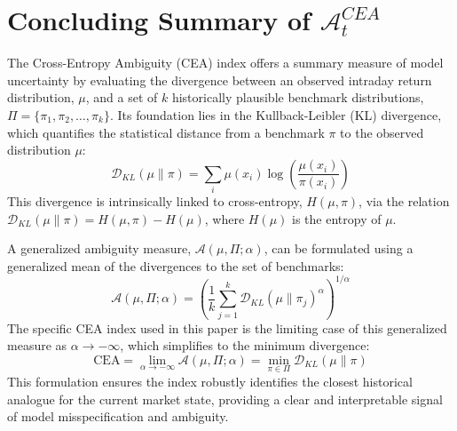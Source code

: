 \documentclass[preprint,12pt,authoryear]{elsarticle}
\begin{document}
\section{Concluding Summary of $\mathcal{A}^{CEA}_t$}
The Cross-Entropy Ambiguity (CEA) index offers a summary measure of model uncertainty by evaluating the divergence between an observed intraday return distribution, $\mu$, and a set of $k$ historically plausible benchmark distributions, $\Pi = \{\pi_1, \pi_2, \dots, \pi_k\}$. Its foundation lies in the Kullback-Leibler (KL) divergence, which quantifies the statistical distance from a benchmark $\pi$ to the observed distribution $\mu$:
\begin{equation}
    \mathcal{D}_{KL}(\mu \| \pi) = \sum_{i} \mu(x_i) \log\left(\frac{\mu(x_i)}{\pi(x_i)}\right)
\end{equation}
This divergence is intrinsically linked to cross-entropy, $H(\mu, \pi)$, via the relation $\mathcal{D}_{KL}(\mu \| \pi) = H(\mu, \pi) - H(\mu)$, where $H(\mu)$ is the entropy of $\mu$.

A generalized ambiguity measure, $\mathcal{A}(\mu, \Pi; \alpha)$, can be formulated using a generalized mean of the divergences to the set of benchmarks:
\begin{equation}
    \mathcal{A}(\mu, \Pi; \alpha) = \left( \frac{1}{k} \sum_{j=1}^{k} \mathcal{D}_{KL}(\mu \| \pi_j)^{\alpha} \right)^{1/\alpha}
\end{equation}
The specific CEA index used in this paper is the limiting case of this generalized measure as $\alpha \to -\infty$, which simplifies to the minimum divergence:
\begin{equation}
    \text{CEA} = \lim_{\alpha \to -\infty} \mathcal{A}(\mu, \Pi; \alpha) = \min_{\pi \in \Pi} \mathcal{D}_{KL}(\mu \| \pi)
\end{equation}
This formulation ensures the index robustly identifies the closest historical analogue for the current market state, providing a clear and interpretable signal of model misspecification and ambiguity.
\end{document}
